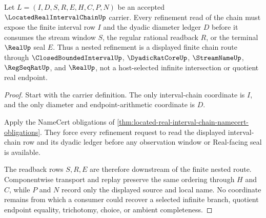 \begin{theorem}
\label{thm:located-real-interval-chain-nested-refinement}
Let $L=(I,D,S,R,E,H,C,P,N)$ be an accepted $\LocatedRealIntervalChainUp$ carrier. Every refinement read of the chain must expose the finite interval row $I$ and the dyadic diameter ledger $D$ before it consumes the stream window $S$, the regular rational readback $R$, or the terminal $\RealUp$ seal $E$. Thus a nested refinement is a displayed finite chain route through $\ClosedBoundedIntervalUp$, $\DyadicRatCoreUp$, $\StreamNameUp$, $\RegSeqRatUp$, and $\RealUp$, not a host-selected infinite intersection or quotient real endpoint.
\end{theorem}
\begin{proof}
Start with the carrier definition. The only interval-chain coordinate is $I$, and the only diameter and endpoint-arithmetic coordinate is $D$.

Apply the NameCert obligations of \autoref{thm:located-real-interval-chain-namecert-obligations}. They force every refinement request to read the displayed interval-chain row and its dyadic ledger before any observation window or Real-facing seal is available.

The readback rows $S,R,E$ are therefore downstream of the finite nested route. Componentwise transport and replay preserve the same ordering through $H$ and $C$, while $P$ and $N$ record only the displayed source and local name. No coordinate remains from which a consumer could recover a selected infinite branch, quotient endpoint equality, trichotomy, choice, or ambient completeness.
\end{proof}

